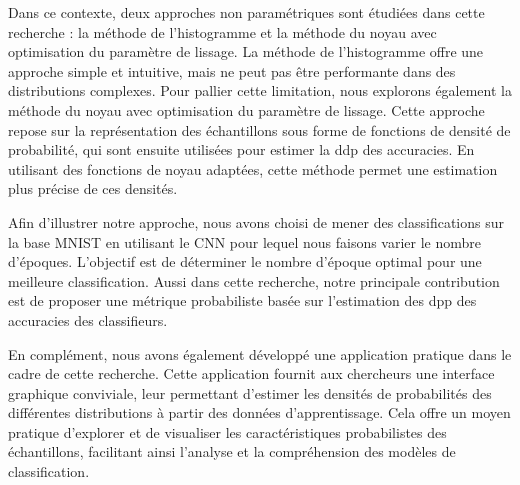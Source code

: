Dans ce contexte, deux approches non paramétriques sont étudiées dans cette recherche : la méthode de l'histogramme et la méthode du noyau avec optimisation du paramètre de lissage. La méthode de l'histogramme offre une approche simple et intuitive, mais ne peut pas être performante dans des distributions complexes. Pour pallier cette limitation, nous explorons également la méthode du noyau avec optimisation du paramètre de lissage. Cette approche repose sur la représentation des échantillons sous forme de fonctions de densité de probabilité, qui sont ensuite utilisées pour estimer la ddp des accuracies. En utilisant des fonctions de noyau adaptées, cette méthode permet une estimation plus précise de ces densités.

Afin d'illustrer notre approche, nous avons choisi de mener des classifications sur la base MNIST en utilisant le CNN pour lequel nous faisons varier le nombre d'époques. L'objectif est de déterminer le nombre d'époque optimal pour une meilleure classification. Aussi dans cette recherche, notre principale contribution est de proposer une métrique probabiliste basée sur l'estimation des dpp des accuracies des classifieurs.

En complément, nous avons également développé une application pratique dans le cadre de cette recherche. Cette application fournit aux chercheurs une interface graphique conviviale, leur permettant d'estimer les densités de probabilités des différentes distributions à partir des données d'apprentissage. Cela offre un moyen pratique d'explorer et de visualiser les caractéristiques probabilistes des échantillons, facilitant ainsi l'analyse et la compréhension des modèles de classification.

